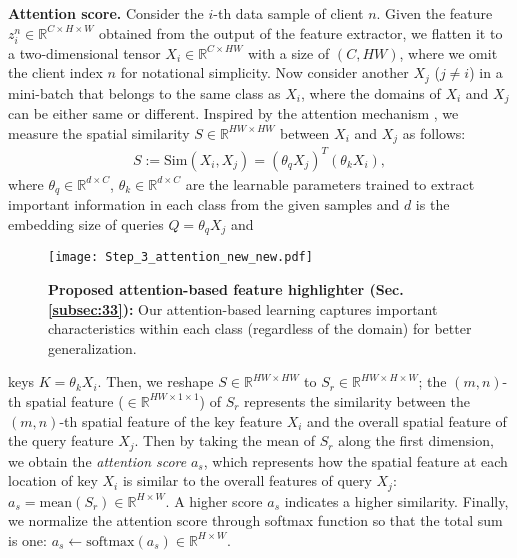 \documentclass{article}
\theoremstyle{plain}
\theoremstyle{definition}
\theoremstyle{remark}
\begin{document}
\textbf{Attention score.} Consider the $i$-th data sample of client $n$. Given the feature $z_i^n \in \mathbb{R}^{C \times H \times W}$  obtained from  the output of the feature extractor, we flatten it to  a two-dimensional tensor $X_i\in \mathbb{R}^{C\times HW}$ with  a size of $(C, HW)$, where we omit the client index  $n$ for notational simplicity. Now consider another $X_j$ ($j\neq i$) in a mini-batch  that belongs to the same class as $X_i$, where the domains of $X_i$ and $X_j$ can be either   same or different. Inspired by the  attention mechanism \cite{vaswani2017attention},   we measure the spatial similarity $S    \in \mathbb{R}^{HW \times HW}$ between   $X_i$ and $X_j$ as follows: 
\begin{align}\label{eq:sim}
S := \mathrm{Sim}(X_i, X_j) =  (\theta_q X_j)^T (\theta_k X_i),
\end{align}
where $\theta_q \in \mathbb{R}^{d \times C}$,  $\theta_k \in \mathbb{R}^{d \times C}$ are the learnable parameters  trained to extract important  information
 in each class from the given samples and $d$ is the embedding size of queries $Q=\theta_q X_j$ and 
 \begin{wrapfigure}{r}{0.52\textwidth}
   \vspace{-3mm}
  \centering
  \texttt{[image: Step\_3\_attention\_new\_new.pdf]}
  \vspace{-4.5mm}
  \caption{\textbf{Proposed attention-based feature highlighter (Sec. \ref{subsec:33}):} Our  attention-based learning  captures   important characteristics within each class (regardless of the domain) for better generalization.}%
  \label{fig:attention}
  \vspace{-3mm}
\end{wrapfigure}
keys $K=\theta_k X_i$.    Then, we reshape  $S\in \mathbb{R}^{HW \times HW}$ to $S_{r} \in \mathbb{R}^{HW \times H \times W}$; the $(m,n)$-th spatial feature ($\in \mathbb{R}^{HW \times 1 \times 1}$)  of $S_{r}$ represents the similarity between the $(m, n)$-th spatial feature of the key feature $X_i$ and the overall spatial feature of the query feature $X_j$. Then by taking the mean of $S_{r}$ along the first dimension, we obtain the \textit{attention score} $a_s$, which represents how the spatial feature at each location of   key $X_i$ is similar to the overall features of   query $X_j$:  $a_s= \mathrm{mean}(S_{r}) \in \mathbb{R}^{H \times W}$. A higher score $a_s$ indicates a higher similarity. %
Finally, we normalize the attention score  through   softmax function so that the total sum is one: $a_s\leftarrow \mathrm{softmax}(a_s) \in \mathbb{R}^{H \times W}$. \\
\end{document}
